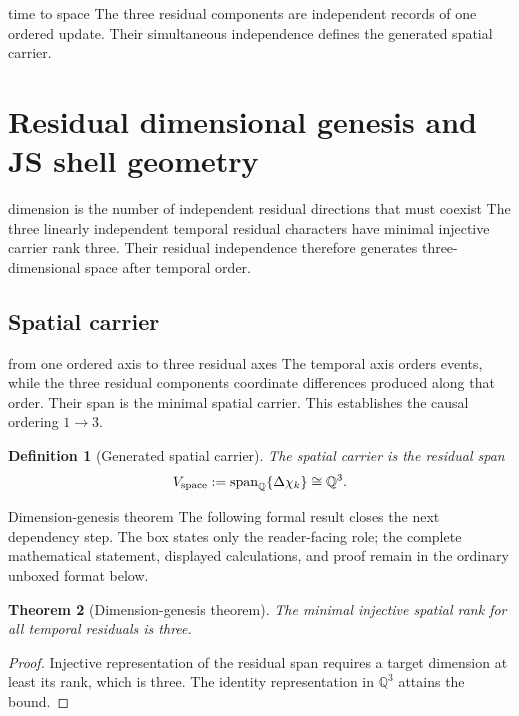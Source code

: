 \documentclass[11pt]{article}
\numberwithin{equation}{section}
\newtheorem{definition}{Definition}[section]
\newtheorem{theorem}[definition]{Theorem}
\theoremstyle{remark}
\newcommand{\Q}{\mathbb{Q}}
\begin{document}
\begin{interpretivebridge}{time to space}
The three residual components are independent records of one ordered update. Their simultaneous independence defines the generated spatial carrier.
\end{interpretivebridge}

\section{Residual dimensional genesis and JS shell geometry}
\begin{conceptledger}{dimension is the number of independent residual directions that must coexist}
The three linearly independent temporal residual characters have minimal injective carrier rank three. Their residual independence therefore generates three-dimensional space after temporal order.
\end{conceptledger}

\label{sec:space}

\subsection{Spatial carrier}
\begin{interpretivebridge}{from one ordered axis to three residual axes}
The temporal axis orders events, while the three residual components coordinate differences produced along that order. Their span is the minimal spatial carrier. This establishes the causal ordering $1\rightarrow3$.
\end{interpretivebridge}

\begin{definition}[Generated spatial carrier]
The spatial carrier is the residual span
\begin{equation}
V_{\rm space}:=\operatorname{span}_{\Q}\{\Delta\chi_k\}\cong\Q^3.
\end{equation}
\end{definition}

\begin{proofguide}{Dimension-genesis theorem}
The following formal result closes the next dependency step. The box states only the reader-facing role; the complete mathematical statement, displayed calculations, and proof remain in the ordinary unboxed format below.
\end{proofguide}
\begin{theorem}[Dimension-genesis theorem]
The minimal injective spatial rank for all temporal residuals is three.
\end{theorem}
\begin{proof}
Injective representation of the residual span requires a target dimension at least its rank, which is three. The identity representation in $\Q^3$ attains the bound.
\end{proof}
\end{document}
